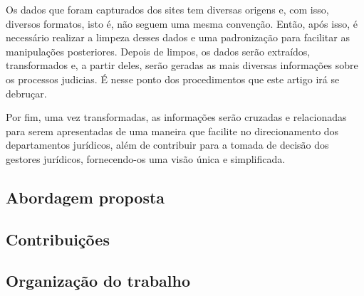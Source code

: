 Os dados que foram capturados dos sites tem diversas origens e, com isso, diversos formatos, isto é, não seguem uma mesma convenção. Então, após isso, é necessário realizar a limpeza desses dados e uma padronização para facilitar as manipulações posteriores. Depois de limpos, os dados serão extraídos, transformados e, a partir deles, serão geradas as mais diversas informações sobre os processos judicias. É nesse ponto dos procedimentos que este artigo irá se debruçar.

Por fim, uma vez transformadas, as informações serão cruzadas e relacionadas para serem apresentadas de uma maneira que facilite no direcionamento dos departamentos jurídicos, além de contribuir para a tomada de decisão dos gestores jurídicos, fornecendo-os uma visão única e simplificada.


\subsection{Abordagem proposta}

\subsection{Contribuições}

\subsection{Organização do trabalho}

